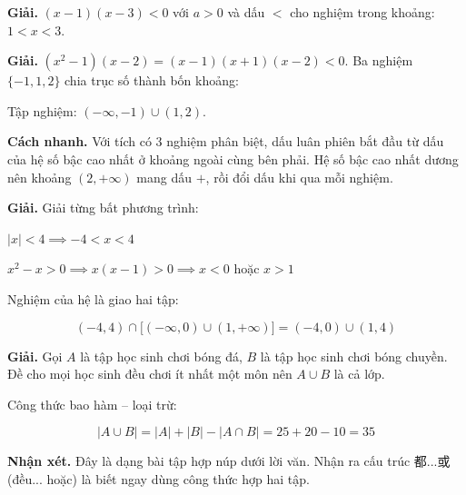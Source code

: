 \documentclass[11pt, a4paper]{article}
\begin{document}
\begin{dapan}[15 — Đáp án B]
\textbf{Giải.} $(x-1)(x-3) < 0$ với $a > 0$ và dấu $<$ cho nghiệm trong khoảng: $1 < x < 3$.
\end{dapan}

\begin{dapan}[16 — Đáp án A]
\textbf{Giải.} $(x^2-1)(x-2) = (x-1)(x+1)(x-2) < 0$. Ba nghiệm $\{-1, 1, 2\}$ chia trục số thành bốn khoảng:


Tập nghiệm: $(-\infty, -1) \cup (1, 2)$.

\textbf{Cách nhanh.} Với tích có $3$ nghiệm phân biệt, dấu luân phiên bắt đầu từ dấu của hệ số bậc cao nhất ở khoảng ngoài cùng bên phải. Hệ số bậc cao nhất dương nên khoảng $(2, +\infty)$ mang dấu $+$, rồi đổi dấu khi qua mỗi nghiệm.
\end{dapan}

\begin{dapan}[17 — Đáp án D]
\textbf{Giải.} Giải từng bất phương trình:

$|x| < 4 \implies -4 < x < 4$

$x^2 - x > 0 \implies x(x-1) > 0 \implies x < 0$ hoặc $x > 1$

Nghiệm của hệ là giao hai tập:

$$(-4, 4) \cap \big[(-\infty,0) \cup (1,+\infty)\big] = (-4, 0) \cup (1, 4)$$
\end{dapan}

\begin{dapan}[18 — Đáp án D]
\textbf{Giải.} Gọi $A$ là tập học sinh chơi bóng đá, $B$ là tập học sinh chơi bóng chuyền. Đề cho mọi học sinh đều chơi ít nhất một môn nên $A \cup B$ là cả lớp.

Công thức bao hàm – loại trừ:

$$|A \cup B| = |A| + |B| - |A \cap B| = 25 + 20 - 10 = 35$$

\textbf{Nhận xét.} Đây là dạng bài tập hợp núp dưới lời văn. Nhận ra cấu trúc 都...或 (đều... hoặc) là biết ngay dùng công thức hợp hai tập.
\end{dapan}
\end{document}
